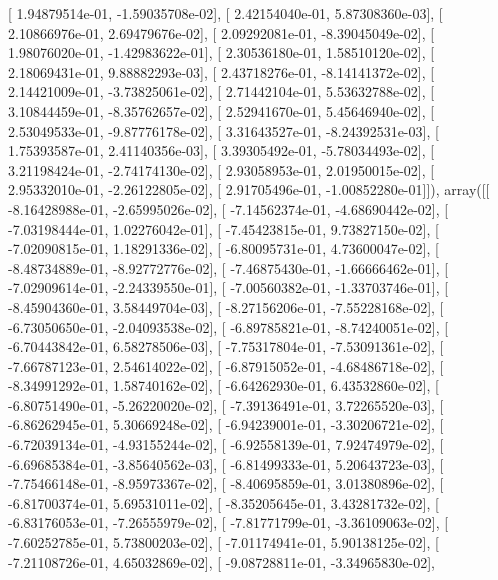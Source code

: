\documentclass{article}
\begin{document}
       [  1.94879514e-01,  -1.59035708e-02],
       [  2.42154040e-01,   5.87308360e-03],
       [  2.10866976e-01,   2.69479676e-02],
       [  2.09292081e-01,  -8.39045049e-02],
       [  1.98076020e-01,  -1.42983622e-01],
       [  2.30536180e-01,   1.58510120e-02],
       [  2.18069431e-01,   9.88882293e-03],
       [  2.43718276e-01,  -8.14141372e-02],
       [  2.14421009e-01,  -3.73825061e-02],
       [  2.71442104e-01,   5.53632788e-02],
       [  3.10844459e-01,  -8.35762657e-02],
       [  2.52941670e-01,   5.45646940e-02],
       [  2.53049533e-01,  -9.87776178e-02],
       [  3.31643527e-01,  -8.24392531e-03],
       [  1.75393587e-01,   2.41140356e-03],
       [  3.39305492e-01,  -5.78034493e-02],
       [  3.21198424e-01,  -2.74174130e-02],
       [  2.93058953e-01,   2.01950015e-02],
       [  2.95332010e-01,  -2.26122805e-02],
       [  2.91705496e-01,  -1.00852280e-01]]), array([[ -8.16428988e-01,  -2.65995026e-02],
       [ -7.14562374e-01,  -4.68690442e-02],
       [ -7.03198444e-01,   1.02276042e-01],
       [ -7.45423815e-01,   9.73827150e-02],
       [ -7.02090815e-01,   1.18291336e-02],
       [ -6.80095731e-01,   4.73600047e-02],
       [ -8.48734889e-01,  -8.92772776e-02],
       [ -7.46875430e-01,  -1.66666462e-01],
       [ -7.02909614e-01,  -2.24339550e-01],
       [ -7.00560382e-01,  -1.33703746e-01],
       [ -8.45904360e-01,   3.58449704e-03],
       [ -8.27156206e-01,  -7.55228168e-02],
       [ -6.73050650e-01,  -2.04093538e-02],
       [ -6.89785821e-01,  -8.74240051e-02],
       [ -6.70443842e-01,   6.58278506e-03],
       [ -7.75317804e-01,  -7.53091361e-02],
       [ -7.66787123e-01,   2.54614022e-02],
       [ -6.87915052e-01,  -4.68486718e-02],
       [ -8.34991292e-01,   1.58740162e-02],
       [ -6.64262930e-01,   6.43532860e-02],
       [ -6.80751490e-01,  -5.26220020e-02],
       [ -7.39136491e-01,   3.72265520e-03],
       [ -6.86262945e-01,   5.30669248e-02],
       [ -6.94239001e-01,  -3.30206721e-02],
       [ -6.72039134e-01,  -4.93155244e-02],
       [ -6.92558139e-01,   7.92474979e-02],
       [ -6.69685384e-01,  -3.85640562e-03],
       [ -6.81499333e-01,   5.20643723e-03],
       [ -7.75466148e-01,  -8.95973367e-02],
       [ -8.40695859e-01,   3.01380896e-02],
       [ -6.81700374e-01,   5.69531011e-02],
       [ -8.35205645e-01,   3.43281732e-02],
       [ -6.83176053e-01,  -7.26555979e-02],
       [ -7.81771799e-01,  -3.36109063e-02],
       [ -7.60252785e-01,   5.73800203e-02],
       [ -7.01174941e-01,   5.90138125e-02],
       [ -7.21108726e-01,   4.65032869e-02],
       [ -9.08728811e-01,  -3.34965830e-02],
\end{document}

